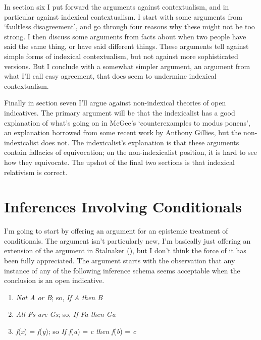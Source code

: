 \documentclass[
  10pt,
  letterpaper,
  DIV=11,
  numbers=noendperiod,
  twoside]{scrartcl}
\providecommand{\tightlist}{%
  \setlength{\itemsep}{0pt}\setlength{\parskip}{0pt}}\usepackage{longtable,booktabs,array}
\begin{document}
In section six I put forward the arguments against contextualism, and in
particular against indexical contextualism. I start with some arguments
from `faultless disagreement', and go through four reasons why these
might not be too strong. I then discuss some arguments from facts about
when two people have said the same thing, or have said different things.
These arguments tell against simple forms of indexical contextualism,
but not against more sophisticated versions. But I conclude with a
somewhat simpler argument, an argument from what I'll call easy
agreement, that does seem to undermine indexical contextualism.

Finally in section seven I'll argue against non-indexical theories of
open indicatives. The primary argument will be that the indexicalist has
a good explanation of what's going on in McGee's `counterexamples to
modus ponens', an explanation borrowed from some recent work by Anthony
Gillies, but the non-indexicalist does not. The indexicalist's
explanation is that these arguments contain fallacies of equivocation;
on the non-indexicalist position, it is hard to see how they equivocate.
The upshot of the final two sections is that indexical relativism is
correct.

\section{Inferences Involving
Conditionals}\label{inferences-involving-conditionals}

I'm going to start by offering an argument for an epistemic treatment of
conditionals. The argument isn't particularly new, I'm basically just
offering an extension of the argument in Stalnaker
(), but I don't think the force
of it has been fully appreciated. The argument starts with the
observation that any instance of any of the following inference schema
seems acceptable when the conclusion is an open indicative.

\begin{enumerate}
\def\labelenumi{\arabic{enumi}.}
\tightlist
\item
  \emph{Not A or B}; so, \emph{If A then B}
\item
  \emph{All Fs are Gs}; so, \emph{If Fa then Ga}
\item
  \emph{f}(\emph{x}) = \emph{f}(\emph{y}); so \emph{If f}(\emph{a}) =
  \emph{c} \emph{then f}(\emph{b}) = \emph{c}
\end{enumerate}
\end{document}
